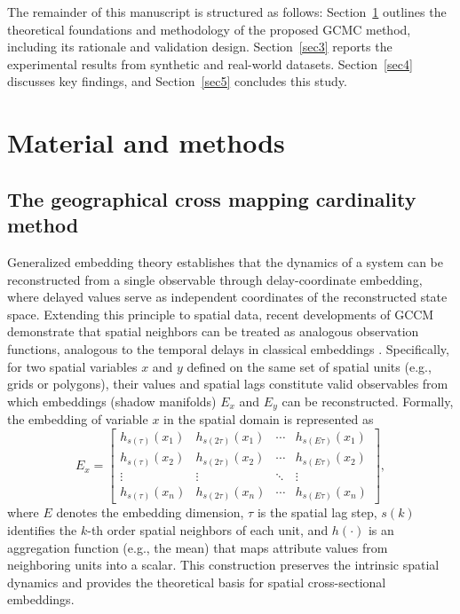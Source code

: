 \documentclass[authoryear,preprint,review,12pt]{elsarticle}
\begin{document}
The remainder of this manuscript is structured as follows: Section~\ref{sec2} outlines the theoretical foundations and methodology of the proposed GCMC method, including its rationale and validation design. Section~\ref{sec3} reports the experimental results from synthetic and real-world datasets. Section~\ref{sec4} discusses key findings, and Section~\ref{sec5} concludes this study.

\section{Material and methods}\label{sec2} 

\subsection{The geographical cross mapping cardinality method}

Generalized embedding theory \citep{Takens1981embedding,Mane1981embedding} establishes that the dynamics of a system can be reconstructed from a single observable through delay-coordinate embedding, where delayed values serve as independent coordinates of the reconstructed state space. Extending this principle to spatial data, recent developments of GCCM demonstrate that spatial neighbors can be treated as analogous observation functions, analogous to the temporal delays in classical embeddings \citep{gao2023gccm}. Specifically, for two spatial variables \(x\) and \(y\) defined on the same set of spatial units (e.g., grids or polygons), their values and spatial lags constitute valid observables from which embeddings (shadow manifolds) \(E_x\) and \(E_y\) can be reconstructed. Formally, the embedding of variable \(x\) in the spatial domain is represented as
\begin{equation}\label{eq-embedding}
E_x = \begin{bmatrix}
h_{s(\tau)}(x_1) & h_{s(2\tau)}(x_1) & \cdots & h_{s(E\tau)}(x_1) \\
h_{s(\tau)}(x_2) & h_{s(2\tau)}(x_2) & \cdots & h_{s(E\tau)}(x_2) \\
\vdots & \vdots & \ddots & \vdots \\
h_{s(\tau)}(x_n) & h_{s(2\tau)}(x_n) & \cdots & h_{s(E\tau)}(x_n)
\end{bmatrix},
\end{equation}
\noindent where \(E\) denotes the embedding dimension, \(\tau\) is the spatial lag step, \(s(k)\) identifies the \(k\)-th order spatial neighbors of each unit, and \(h(\cdot)\) is an aggregation function (e.g., the mean) that maps attribute values from neighboring units into a scalar. This construction preserves the intrinsic spatial dynamics and provides the theoretical basis for spatial cross-sectional embeddings.
\end{document}
